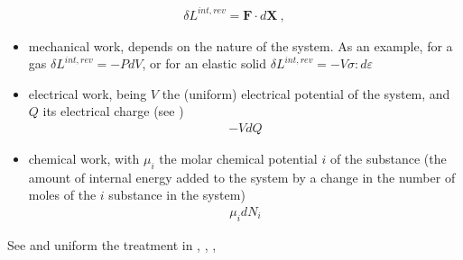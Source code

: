 \documentclass[letterpaper,10pt,english]{jupyterBook}
\begin{document}
\begin{equation*}
\begin{split}\delta L^{int,rev} = \mathbf{F} \cdot d \mathbf{X} \ ,\end{split}
\end{equation*}\begin{itemize}
\item {} 
\sphinxAtStartPar
mechanical work, depends on the nature of the system. As an example, for a gas \(\delta L^{int,rev} = - P d V\), or for an elastic solid \(\delta L^{int,rev} = - V \sigma : d \varepsilon\)

\item {} 
\sphinxAtStartPar
electrical work, being \(V\) the (uniform) electrical potential of the system, and \(Q\) its electrical charge (see )
\begin{equation*}
\begin{split}- V d Q\end{split}
\end{equation*}
\item {} 
\sphinxAtStartPar
chemical work, with \(\mu_i\) the molar chemical potential \(i\) of the substance (the amount of internal energy added to the system by a change in the number of moles of the \(i\) substance in the system)
\begin{equation*}
\begin{split}\mu_i d N_i\end{split}
\end{equation*}
\end{itemize}

\sphinxAtStartPar
{} See and uniform the treatment in , , , {\hyperref[\detokenize{ch/potentials:classical-thermodynamics-potentials}]{}}
\end{document}
